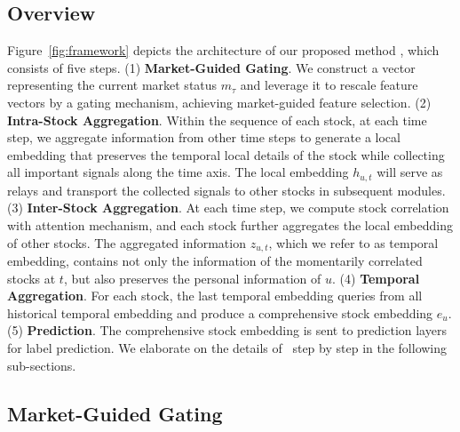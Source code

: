 \subsection{Overview}
Figure~\ref{fig:framework} depicts the architecture of our proposed method \frameworkname, which consists of five steps.
(1) \textbf{Market-Guided Gating}. We construct a vector representing the current market status $m_\tau$ and leverage it to rescale feature vectors by a gating mechanism, achieving market-guided feature selection.
(2) \textbf{Intra-Stock Aggregation}.
Within the sequence of each stock, at each time step, we aggregate information from other time steps to generate a local embedding that preserves the temporal local details of the stock while collecting all important signals along the time axis.
The local embedding $h_{u,t}$ will serve as relays and transport the collected signals to other stocks in subsequent modules.
(3) \textbf{Inter-Stock Aggregation}.
At each time step, we compute stock correlation with attention mechanism, and each stock further aggregates the local embedding of other stocks. 
The aggregated information $z_{u,t}$, which we refer to as temporal embedding, contains not only the information of the momentarily correlated stocks at $t$, but also preserves the personal information of $u$.
(4) \textbf{Temporal Aggregation}.
For each stock, the last temporal embedding queries from all historical temporal embedding and produce a comprehensive stock embedding $e_{u}$.
(5) \textbf{Prediction}.
The comprehensive stock embedding is sent to prediction layers for label prediction.
We elaborate on the details of \frameworkname~step by step in the following sub-sections.

\subsection{Market-Guided Gating}
